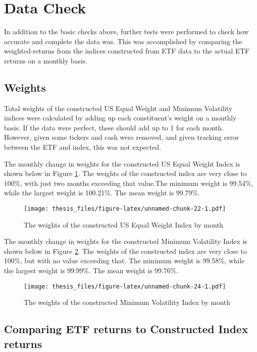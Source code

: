 \documentclass[12pt,twoside]{reedthesis}
\theoremstyle{definition}
\theoremstyle{definition}
\theoremstyle{definition}
\theoremstyle{remark}
\begin{document}
\section{Data Check}\label{data-check}

In addition to the basic checks above, further tests were performed to
check how accurate and complete the data was. This was accomplished by
comparing the weighted-returns from the indices constructed from ETF
data to the actual ETF returns on a monthly basis.

\subsection{Weights}\label{weights}

Total weights of the constructed US Equal Weight and Minimum Volatility
indices were calculated by adding up each constituent's weight on a
monthly basis. If the data were perfect, these should add up to 1 for
each month. However, given some tickers and cash were removed, and given
tracking error between the ETF and index, this was not expected.

The monthly change in weights for the constructed US Equal Weight Index
is shown below in Figure \ref{fig:plot1}. The weights of the constructed
index are very close to 100\%, with just two months exceeding that
value.The minimum weight is 99.54\%, while the largest weight is
100.21\%. The mean weight is 99.79\%.
\begin{figure}[htbp]
\centering
\texttt{[image: thesis\_files/figure-latex/unnamed-chunk-22-1.pdf]}
\caption{\label{fig:unnamed-chunk-22}The weights of the constructed US Equal
Weight Index by month\label{fig:plot1}}
\end{figure}
\newline

The monthly change in weights for the constructed Minimum Volatility
Index is shown below in Figure \ref{fig:plot2}. The weights of the
constructed index are very close to 100\%, but with no value exceeding
that. The minimum weight is 99.58\%, while the largest weight is
99.99\%. The mean weight is 99.76\%.
\begin{figure}[htbp]
\centering
\texttt{[image: thesis\_files/figure-latex/unnamed-chunk-24-1.pdf]}
\caption{\label{fig:unnamed-chunk-24}The weights of the constructed Minimum
Volatility Index by month\label{fig:plot2}}
\end{figure}
\subsection{Comparing ETF returns to Constructed Index
returns}\label{comparing-etf-returns-to-constructed-index-returns}
\end{document}
